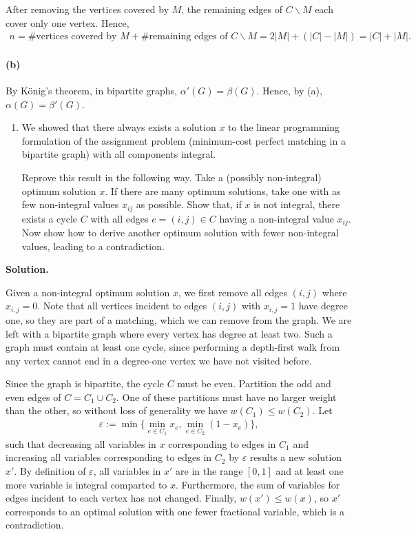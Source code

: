 \documentclass[11pt,letterpaper]{article}
\theoremstyle{definition}
\newcommand{\solution}{\medskip\noindent\textbf{Solution.}\par\medskip}
\begin{document}
After removing the vertices covered by $M$, the remaining edges of $C\backslash M$ each cover only one vertex.
Hence, 
\begin{align*}
    n = \text{\#vertices covered by }M + \text{\#remaining edges of }C\backslash M = 2|M| + (|C| - |M|) = |C| + |M|.
\end{align*}

\paragraph{(b)}
By K\"onig's theorem, in bipartite graphs, $\alpha'(G) = \beta(G)$. Hence, by (a), $\alpha(G) = \beta'(G)$.


\begin{enumerate}[resume]
\item We showed that there always exists a solution $x$ to the linear programming formulation of the assignment problem (minimum-cost perfect matching in a bipartite graph) with all components integral.

Reprove this result in the following way. Take a (possibly non-integral) optimum solution $x$. If there are many optimum solutions, take one with as few non-integral values $x_{ij}$ as possible. Show that, if $x$ is not integral, there exists a cycle $C$ with all edges $e = (i,j) \in C$ having a non-integral value $x_{ij}$. Now show how to derive another optimum solution with fewer non-integral values, leading to a contradiction.
\end{enumerate}

\solution

Given a non-integral optimum solution $x$, we first remove all edges $(i,j)$ where $x_{i,j}=0$. 
Note that all vertices incident to edges $(i,j)$ with $x_{i,j}=1$ have degree one, so they are part of a matching, which we can remove from the graph.
We are left with a bipartite graph where every vertex has degree at least two. 
Such a graph must contain at least one cycle, since performing a depth-first walk from any vertex cannot end in a degree-one vertex we have not visited before.

Since the graph is bipartite, the cycle $C$ must be even. 
Partition the odd and even edges of $C=C_1\cup C_2$. 
One of these partitions must have no larger weight than the other, so without loss of generality we have $w(C_1)\leq w(C_2)$.
Let 
\begin{align*}
    \varepsilon := \min\{\min_{e\in C_1}x_e, \min_{e\in C_2}(1-x_e)\},
\end{align*}
such that decreasing all variables in $x$ corresponding to edges in $C_1$ and increasing all variables corresponding to edges in $C_2$ by $\varepsilon$ results a new solution $x'$.
By definition of $\varepsilon$, all variables in $x'$ are in the range $[0,1]$ and at least one more variable is integral comparted to $x$.
Furthermore, the sum of variables for edges incident to each vertex has not changed.
Finally, $w(x')\leq w(x)$, so $x'$ corresponds to an optimal solution with one fewer fractional variable, which is a contradiction.
\end{document}
